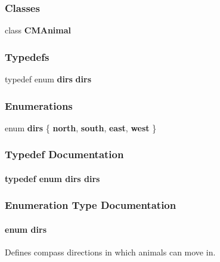 \subsubsection*{Classes}
\begin{DoxyCompactItemize}
\item 
class {\bf C\-M\-Animal}
\end{DoxyCompactItemize}
\subsubsection*{Typedefs}
\begin{DoxyCompactItemize}
\item 
typedef enum {\bf dirs} {\bf dirs}
\end{DoxyCompactItemize}
\subsubsection*{Enumerations}
\begin{DoxyCompactItemize}
\item 
enum {\bf dirs} \{ {\bf north}, 
{\bf south}, 
{\bf east}, 
{\bf west}
 \}
\end{DoxyCompactItemize}


\subsubsection{Typedef Documentation}
\paragraph[{dirs}]{\setlength{\rightskip}{0pt plus 5cm}typedef enum {\bf dirs}
 {\bf dirs}}\label{_c_m_animal_8h_ab87e8be2cafe2008c5eaf36fd8e3cfb1}


\subsubsection{Enumeration Type Documentation}
\paragraph[{dirs}]{\setlength{\rightskip}{0pt plus 5cm}enum {\bf dirs}}\label{_c_m_animal_8h_aeac25a28aa4d3c6009f7249ee82ae12d}


Defines compass directions in which animals can move in. 


